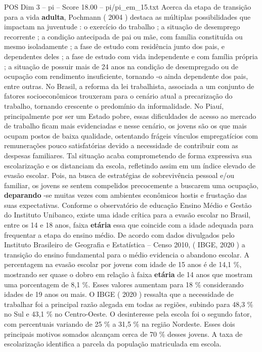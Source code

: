 \begin{textsample}{POS Dim 3 – pi – Score 18.00 – pi/pi\_em\_15.txt}
Acerca da etapa de transição para a vida \textbf{adulta}, Pochmann ( 2004 ) destaca as múltiplas possibilidades que impactam na juventude : o exercício do trabalho ; a situação de desemprego recorrente ; a condição antecipada de pai ou mãe, com família constituída ou mesmo isoladamente ; a fase de estudo com residência junto dos pais, e dependentes deles ; a fase de estudo com vida independente e com família própria ; a situação de possuir mais de 24 anos na condição de desempregado ou de ocupação com rendimento insuficiente, tornando -o ainda dependente dos pais, entre outras.
No Brasil, a reforma da lei trabalhista, associada a um conjunto de fatores socioeconômicos trouxeram para o cenário atual a precarização do trabalho, tornando crescente o predomínio da informalidade.
No Piauí, principalmente por ser um Estado pobre, essas dificuldades de acesso ao mercado de trabalho ficam mais evidenciadas e nesse cenário, os jovens são os que mais ocupam postos de baixa qualidade, ostentando frágeis vínculos empregatícios com remunerações pouco satisfatórias devido a necessidade de contribuir com as despesas familiares.
Tal situação acaba comprometendo de forma expressiva sua escolarização e os distanciam da escola, refletindo assim em um índice elevado de evasão escolar.
Pois, na busca de estratégias de sobrevivência pessoal e/ou familiar, os jovens se sentem compelidos precocemente a buscarem uma ocupação, \textbf{deparando} -se muitas vezes com ambientes econômicos hostis e frustação das suas expectativas.
Conforme o observatório de educação Ensino Médio e Gestão do Instituto Unibanco, existe uma idade crítica para a evasão escolar no Brasil, entre os 14 e 18 anos, faixa \textbf{etária} essa que coincide com a idade adequada para frequentar a etapa do ensino médio.
De acordo com dados divulgados pelo Instituto Brasileiro de Geografia e Estatística – Censo 2010, ( IBGE, 2020 ) a transição do ensino fundamental para o médio evidencia o abandono escolar.
A percentagem na evasão escolar por jovens com idade de 15 anos é de 14,1 \%, mostrando ser quase o dobro em relação à faixa \textbf{etária} de 14 anos que mostram uma porcentagem de 8,1 \%.
Esses valores aumentam para 18 \% considerando idades de 19 anos ou mais.
O IBGE ( 2020 ) ressalta que a necessidade de trabalhar foi a principal razão alegada em todas as regiões, subindo para 48,3 \% no Sul e 43,1 \% no Centro-Oeste.
O desinteresse pela escola foi o segundo fator, com percentuais variando de 25 \% a 31,5 \% na região Nordeste.
Esses dois principais motivos somados alcançam cerca de 70 \% desses jovens.
A taxa de escolarização identifica a parcela da população matriculada em escola.

\end{textsample}
